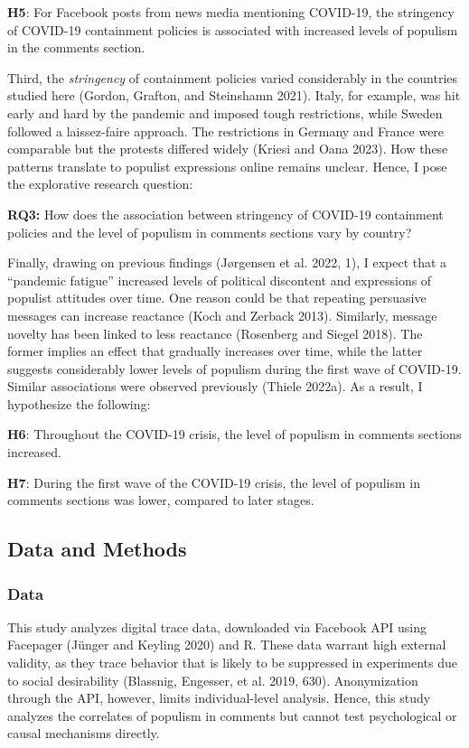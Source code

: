 \documentclass[
]{ccr}
\begin{document}
\textbf{H5}: For Facebook posts from news media mentioning COVID-19, the
stringency of COVID-19 containment policies is associated with increased
levels of populism in the comments section.

Third, the \emph{stringency} of containment policies varied considerably
in the countries studied here (Gordon, Grafton, and Steinshamn 2021).
Italy, for example, was hit early and hard by the pandemic and imposed
tough restrictions, while Sweden followed a laissez-faire approach. The
restrictions in Germany and France were comparable but the protests
differed widely (Kriesi and Oana 2023). How these patterns translate to
populist expressions online remains unclear. Hence, I pose the
explorative research question:

\textbf{RQ3:} How does the association between stringency of COVID-19
containment policies and the level of populism in comments sections vary
by country?

Finally, drawing on previous findings (Jørgensen et al. 2022, 1), I
expect that a ``pandemic fatigue'' increased levels of political
discontent and expressions of populist attitudes over time. One reason
could be that repeating persuasive messages can increase reactance (Koch
and Zerback 2013). Similarly, message novelty has been linked to less
reactance (Rosenberg and Siegel 2018). The former implies an effect that
gradually increases over time, while the latter suggests considerably
lower levels of populism during the first wave of COVID-19. Similar
associations were observed previously (Thiele 2022a). As a result, I
hypothesize the following:

\textbf{H6}: Throughout the COVID-19 crisis, the level of populism in
comments sections increased.

\textbf{H7}: During the first wave of the COVID-19 crisis, the level of
populism in comments sections was lower, compared to later stages.

\hypertarget{data-and-methods}{%
\subsection{Data and Methods}\label{data-and-methods}}

\hypertarget{data}{%
\subsubsection{Data}\label{data}}

This study analyzes digital trace data, downloaded via Facebook API
using Facepager (Jünger and Keyling 2020) and R. These data warrant high
external validity, as they trace behavior that is likely to be
suppressed in experiments due to social desirability (Blassnig,
Engesser, et al. 2019, 630). Anonymization through the API, however,
limits individual-level analysis. Hence, this study analyzes the
correlates of populism in comments but cannot test psychological or
causal mechanisms directly.
\end{document}
